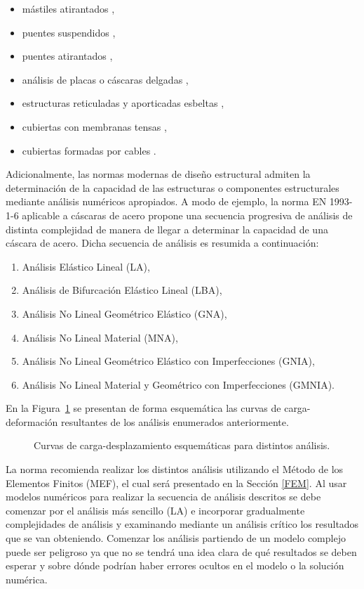\begin{itemize}
	\item mástiles atirantados \citep{Sparling1995},
	\item puentes suspendidos \citep{Larsen2000},
	\item puentes atirantados \citep{Wu2015,Madrazo-Aguirre2015},
	\item análisis de placas o cáscaras delgadas \citep{Hunt1998},
	\item estructuras reticuladas y aporticadas esbeltas \citep{Morozov2011},
	\item cubiertas con membranas tensas \citep{Bridgens2012},
	\item cubiertas formadas por cables \citep{Feng2013}.
\end{itemize}

Adicionalmente, las normas modernas de diseño estructural admiten la determinación de la capacidad de las estructuras o componentes estructurales mediante análisis numéricos apropiados. A modo de ejemplo, la norma EN 1993-1-6 aplicable a cáscaras de acero propone una secuencia progresiva de análisis de distinta complejidad de manera de llegar a determinar la capacidad de una cáscara de acero. Dicha secuencia de análisis es resumida a continuación:
%
\begin{enumerate}
	\item[1)]Análisis Elástico Lineal (LA),
	\item[2)]Análisis de Bifurcación Elástico Lineal (LBA),
	\item[3)]Análisis No Lineal Geométrico Elástico (GNA),
	\item[4)]Análisis No Lineal Material (MNA),
	\item[5)]Análisis No Lineal Geométrico Elástico con Imperfecciones (GNIA),
	\item[6)]Análisis No Lineal Material y Geométrico con Imperfecciones (GMNIA).
\end{enumerate}

En la Figura~\ref{fig:fig0} se presentan de forma esquemática las curvas de carga-deformación resultantes de los análisis enumerados anteriormente. %
%

\begin{figure}[htb]
	\centering
   \def\svgwidth{0.75\textwidth}
   
	\caption{Curvas de carga-desplazamiento esquemáticas para distintos análisis.}
	\label{fig:fig0}
\end{figure}

La norma recomienda realizar los distintos análisis utilizando el Método de los Elementos Finitos (MEF), el cual será presentado en la Sección \ref{FEM}. %
%
Al usar modelos numéricos para realizar la secuencia de análisis descritos se debe comenzar por el análisis más sencillo (LA) e incorporar gradualmente complejidades de análisis y examinando mediante un análisis crítico los resultados que se van obteniendo. %
%
Comenzar los análisis partiendo de un modelo complejo puede ser peligroso ya que no se tendrá una idea clara de qué resultados se deben esperar y sobre dónde podrían haber errores ocultos en el modelo o la solución numérica.

